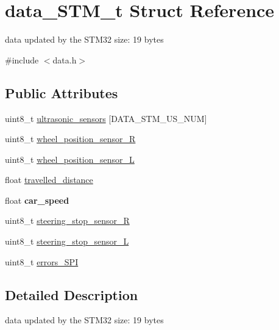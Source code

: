 \hypertarget{structdata___s_t_m__t}{}\section{data\+\_\+\+S\+T\+M\+\_\+t Struct Reference}
\label{structdata___s_t_m__t}


data updated by the S\+T\+M32 size\+: 19 bytes  




{\ttfamily \#include $<$data.\+h$>$}

\subsection*{Public Attributes}
\begin{DoxyCompactItemize}
\item 
uint8\+\_\+t \hyperlink{structdata___s_t_m__t_a2b584d14638921f686e91193ab59937c}{ultrasonic\+\_\+sensors} \mbox{[}D\+A\+T\+A\+\_\+\+S\+T\+M\+\_\+\+U\+S\+\_\+\+N\+UM\mbox{]}
\item 
uint8\+\_\+t \hyperlink{structdata___s_t_m__t_a86c2662ee8ae8cef331de1a36285e9ee}{wheel\+\_\+position\+\_\+sensor\+\_\+R}
\item 
uint8\+\_\+t \hyperlink{structdata___s_t_m__t_a179ffd7182c86ef85d3a5bbd1acf3290}{wheel\+\_\+position\+\_\+sensor\+\_\+L}
\item 
float \hyperlink{structdata___s_t_m__t_ae80e8b57c0137231caeb56a150d46aa4}{travelled\+\_\+distance}
\item 
\hypertarget{structdata___s_t_m__t_a0698d95871bb093c21f1216ff752d9de}{}\label{structdata___s_t_m__t_a0698d95871bb093c21f1216ff752d9de} 
float {\bfseries car\+\_\+speed}
\item 
uint8\+\_\+t \hyperlink{structdata___s_t_m__t_ad64d7eb43c330d4d3bf79aa82210728a}{steering\+\_\+stop\+\_\+sensor\+\_\+R}
\item 
uint8\+\_\+t \hyperlink{structdata___s_t_m__t_a7c8c5193fdfd26fc6cb6b7c78608903d}{steering\+\_\+stop\+\_\+sensor\+\_\+L}
\item 
uint8\+\_\+t \hyperlink{structdata___s_t_m__t_aaab013b9618bb1e5045806ff4ff47602}{errors\+\_\+\+S\+PI}
\end{DoxyCompactItemize}


\subsection{Detailed Description}
data updated by the S\+T\+M32 size\+: 19 bytes 


